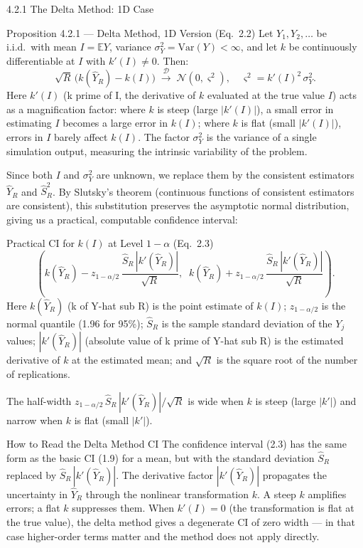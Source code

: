 \documentclass[aspectratio=169,10pt]{beamer}
\begin{document}
\begin{frame}[allowframebreaks]{4.2.1 The Delta Method: 1D Case}
\begin{block}{Proposition 4.2.1 --- Delta Method, 1D Version (Eq.\ 2.2)}
  Let $Y_1, Y_2, \ldots$ be i.i.d.\ with mean $I = \mathbb{E}Y$,
  variance $\sigma_Y^2 = \mathrm{Var}(Y) < \infty$, and let $k$ be
  continuously differentiable at $I$ with $k'(I) \neq 0$.  Then:
  \[
    \sqrt{R}\,\bigl(k(\hat{Y}_R) - k(I)\bigr)
      \;\xrightarrow{\mathcal{D}}\; \mathcal{N}(0, \varsigma^2),
    \quad \varsigma^2 = k'(I)^2\,\sigma_Y^2.
  \]
  Here $k'(I)$ (k prime of I, the derivative of $k$ evaluated at the
  true value $I$) acts as a magnification factor: where $k$ is steep
  (large $|k'(I)|$), a small error in estimating $I$ becomes a large
  error in $k(I)$; where $k$ is flat (small $|k'(I)|$), errors in $I$
  barely affect $k(I)$.  The factor $\sigma_Y^2$ is the variance of a
  single simulation output, measuring the intrinsic variability of
  the problem.
\end{block}

\framebreak

Since both $I$ and $\sigma_Y^2$ are unknown, we replace them by the
consistent estimators $\hat{Y}_R$ and $\hat{S}_R^2$.  By Slutsky's
theorem (continuous functions of consistent estimators are consistent),
this substitution preserves the asymptotic normal distribution, giving
us a practical, computable confidence interval:

\begin{block}{Practical CI for $k(I)$ at Level $1-\alpha$ (Eq.\ 2.3)}
  \[
    \left(
      k(\hat{Y}_R) - z_{1-\alpha/2}\,\frac{\hat{S}_R\,|k'(\hat{Y}_R)|}{\sqrt{R}},\;\;
      k(\hat{Y}_R) + z_{1-\alpha/2}\,\frac{\hat{S}_R\,|k'(\hat{Y}_R)|}{\sqrt{R}}
    \right). \tag{2.3}
  \]
  Here $k(\hat{Y}_R)$ (k of Y-hat sub R) is the point estimate of
  $k(I)$; $z_{1-\alpha/2}$ is the normal quantile (1.96 for 95\%);
  $\hat{S}_R$ is the sample standard deviation of the $Y_j$ values;
  $|k'(\hat{Y}_R)|$ (absolute value of k prime of Y-hat sub R) is the
  estimated derivative of $k$ at the estimated mean; and $\sqrt{R}$
  is the square root of the number of replications.

  The half-width $z_{1-\alpha/2}\,\hat{S}_R\,|k'(\hat{Y}_R)|/\sqrt{R}$
  is wide when $k$ is steep (large $|k'|$) and narrow when $k$ is flat
  (small $|k'|$).
\end{block}

\begin{alertblock}{How to Read the Delta Method CI}
  The confidence interval (2.3) has the same form as the basic CI (1.9)
  for a mean, but with the standard deviation $\hat{S}_R$ replaced by
  $\hat{S}_R\,|k'(\hat{Y}_R)|$.  The derivative factor $|k'(\hat{Y}_R)|$
  propagates the uncertainty in $\hat{Y}_R$ through the nonlinear
  transformation $k$.  A steep $k$ amplifies errors; a flat $k$
  suppresses them.  When $k'(I) = 0$ (the transformation is flat at the
  true value), the delta method gives a degenerate CI of zero width ---
  in that case higher-order terms matter and the method does not apply
  directly.
\end{alertblock}


\end{frame}
\end{document}
